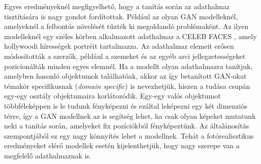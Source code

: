 Egyes eredményeknél megfigyelhető, hogy a tanítás során az adathalmaz tisztítására is nagy gondot fordítottak. Például az olyan GAN modelleknél, amelyeknél a felbontás növelését tűzték ki megoldandó problémaként. Az ilyen modelleknél egy széles körben alkalmazott adathalmaz a CELEB FACES \cite{liu2015faceattributes}, amely hollywoodi hírességek portréit tartalmazza. Az adathalmaz elemeit erősen módosították a szerzők, például a szemeket és az egyéb arci jellegzetességeket pozicionálták minden egyes elemnél.
Ha a modellt olyan adathalmazra tanítjuk, amelyben hasonló objektumok találhatóak, akkor az így betanított GAN-okat témakör specifikusnak (\textit{domain specific}) is nevezhetjük, hiszen a tudása csupán egy-egy osztály objektumaira korlátozódik. Egy-egy valós objektumot többféleképpen is le tudunk fényképezni és ezáltal leképezni egy két dimenziós térre, így a GAN modellnek az is segítség lehet, ha csak olyan képeket mutatunk neki a tanítás során, amelyeket fix pozíciókból fényképeztünk. Az általánosítás szempontjából ez egy nagy könnyítés lehet a modellnek.
Tehát a fotórealisztikus eredményeket elérő modellek esetén kijelenthetjük, hogy nagy szerepe van a megfelelő adathalmaznak is.

